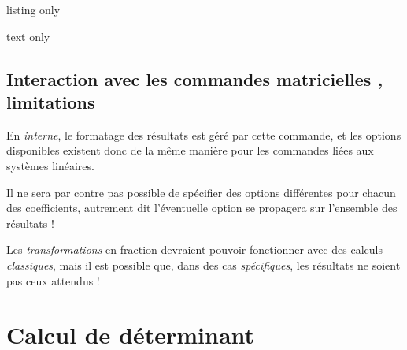 \documentclass[a4paper,11pt]{article}
\begin{document}
\begin{PresentationCode}{listing only}





\end{PresentationCode}

\begin{PresentationCode}{text only}
\hfill{} \qquad
{} \qquad
{} \qquad
{} \qquad
{} \qquad
{}\hfill~
\end{PresentationCode}

\subsection{Interaction avec les commandes \og matricielles \fg, limitations}

\begin{warningblock}
En \textit{interne}, le formatage des résultats est géré par cette commande, et les options disponibles existent donc de la même manière pour les commandes liées aux systèmes linéaires.

\smallskip

Il ne sera par contre pas possible de spécifier des options différentes pour chacun des coefficients, autrement dit l'éventuelle option se propagera sur l'ensemble des résultats !

\smallskip

Les \textit{transformations} en fraction devraient pouvoir fonctionner avec des calculs \textit{classiques}, mais il est possible que, dans des cas \textit{spécifiques}, les résultats ne soient pas ceux attendus !
\end{warningblock}

\pagebreak

\section{Calcul de déterminant}
\end{document}
